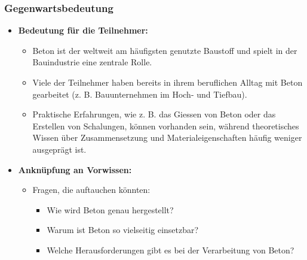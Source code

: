 \documentclass[
11pt,
captions=tableheading,
smallheadings,
headsepline,
footsepline, 
captions=tableheading,
parskip=half-,
]{scrartcl}
\begin{document}
\subsubsection{Gegenwartsbedeutung}
\begin{itemize}
    \item \textbf{Bedeutung für die Teilnehmer:}
          \begin{itemize}
              \item Beton ist der weltweit am häufigsten genutzte Baustoff und spielt in der Bauindustrie eine zentrale Rolle.
              \item Viele der Teilnehmer haben bereits in ihrem beruflichen Alltag mit Beton gearbeitet (z. B. Bauunternehmen im Hoch- und Tiefbau).
              \item Praktische Erfahrungen, wie z. B. das Giessen von Beton oder das Erstellen von Schalungen, können vorhanden sein, während theoretisches Wissen über Zusammensetzung und Materialeigenschaften häufig weniger ausgeprägt ist.
          \end{itemize}
    \item \textbf{Anknüpfung an Vorwissen:}
          \begin{itemize}
              \item Fragen, die auftauchen könnten:
                    \begin{itemize}
                        \item Wie wird Beton genau hergestellt?
                        \item Warum ist Beton so vielseitig einsetzbar?
                        \item Welche Herausforderungen gibt es bei der Verarbeitung von Beton?
                    \end{itemize}
          \end{itemize}
\end{itemize}
\end{document}
